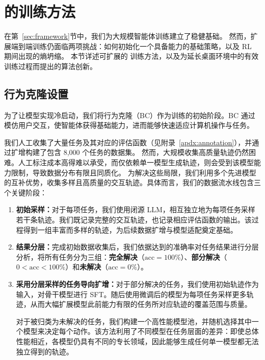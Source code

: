\section{\computerrl 的训练方法}\label{sec:training}
在第~\ref{sec:framework}节中，我们为大规模智能体训练建立了稳健基础。
然而，扩展端到端训练仍面临两项挑战：如何初始化一个具备能力的基础策略，以及 RL 期间出现的熵坍缩。
本节详述可扩展的 \computerrl 训练方法，以及为延长桌面环境中的有效训练过程而提出的算法创新。

\subsection{行为克隆设置}\label{sec:bc-training}
为了让模型实现冷启动，我们将行为克隆（BC）作为训练的初始阶段。BC 通过模仿用户交互，使智能体获得基础能力，进而能够快速适应计算机操作与任务。

我们人工收集了大量任务及其对应的评估函数（见附录~\ref{apdx:annotation}），并通过扩增构建了包含 8,000 个任务的数据集。
然而，大规模收集高质量轨迹仍然困难。人工标注成本高得难以承受，而仅依赖单一模型生成轨迹，则会受到该模型能力限制，导致数据分布有限且同质化。
为解决这些局限，我们利用多个先进模型的互补优势，收集多样且高质量的交互轨迹。具体而言，我们的数据流水线包含三个关键阶段：

\begin{enumerate}[leftmargin=1.5em,itemsep=0pt,parsep=0.2em,topsep=0.0em,partopsep=0.0em]
    \item \textbf{初始采样：}对于每项任务，我们使用闭源 LLM，相互独立地为每项任务采样若干条轨迹。我们既记录完整的交互轨迹，也记录相应评估函数的输出。该过程得到一组丰富而多样的轨迹，为后续数据扩增与模型适配奠定基础。

    \item \textbf{结果分层：}完成初始数据收集后，我们依据达到的准确率对任务结果进行分层分析，将所有任务分为三组：\textbf{完全解决}（$\mathrm{acc}=100\%$）、\textbf{部分解决}（$0<\mathrm{acc}<100\%$）和\textbf{未解决}（$\mathrm{acc}=0\%$）。

    \item \textbf{采用分层采样的任务导向扩增：}对于部分解决的任务，我们使用初始轨迹作为输入，对骨干模型进行 SFT。随后使用微调后的模型为每项任务采样更多轨迹，从而大幅扩展模型此前能力有限的任务所对应轨迹的覆盖范围与质量。

    对于被归类为未解决的任务，我们构建一个高性能模型池，并随机选择其中一个模型来决定每个动作。该方法利用了不同模型在任务层面的差异：即使总体性能相近，各模型仍具有不同的专长领域，因此能够生成任何单一模型都无法独立得到的轨迹。
\end{enumerate}

